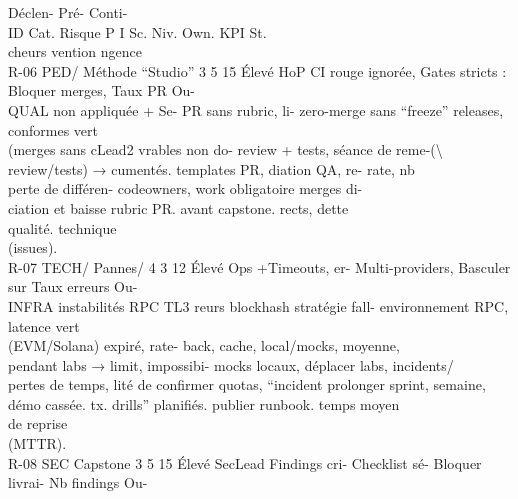 \vspace{0.5em}
Déclen-           Pré-              Conti-\\
ID         Cat.     Risque            P I Sc. Niv. Own.                                                             KPI           St.\\
cheurs            vention           ngence\\
R-06       PED/     Méthode “Studio” 3 5 15 Élevé HoP      CI rouge ignorée, Gates stricts : Bloquer merges, Taux            PR Ou-\\
QUAL     non      appliquée            +    Se- PR sans rubric, li- zero-merge sans “freeze” releases, conformes      vert\\
(merges       sans            cLead2 vrables non do- review + tests, séance de reme-(\textbackslash{}%
review/tests) →                        cumentés.           templates   PR, diation QA, re- rate,         nb\\
perte de différen-                                         codeowners,     work obligatoire merges       di-\\
ciation et baisse                                          rubric PR.      avant capstone. rects,      dette\\
qualité.                                                                                      technique\\
(issues).\\
R-07       TECH/    Pannes/          4 3 12 Élevé Ops       +Timeouts,       er- Multi-providers, Basculer         sur Taux erreurs Ou-\\
INFRA    instabilités RPC              TL3        reurs blockhash stratégie          fall- environnement RPC, latence vert\\
(EVM/Solana)                             expiré,       rate- back,       cache, local/mocks,       moyenne,\\
pendant labs →                           limit, impossibi- mocks        locaux, déplacer     labs, incidents/\\
pertes de temps,                         lité de confirmer quotas, “incident prolonger sprint, semaine,\\
démo cassée.                             tx.                 drills” planifiés. publier runbook. temps moyen\\
de     reprise\\
(MTTR).\\
R-08       SEC      Capstone          3 5 15 Élevé SecLead Findings     cri- Checklist      sé- Bloquer    livrai- Nb findings Ou-\\

